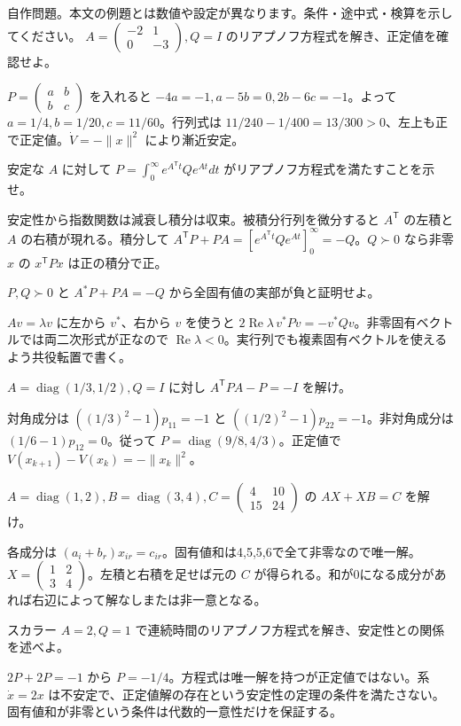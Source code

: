 \documentclass[11pt]{article}
\begin{document}
自作問題。本文の例題とは数値や設定が異なります。条件・途中式・検算を示してください。
\problem[連続時間の成分計算]
$A=\begin{pmatrix}-2&1\\0&-3\end{pmatrix},Q=I$ のリアプノフ方程式を解き、正定値を確認せよ。
\begin{ans}
$P=\begin{pmatrix}a&b\\b&c\end{pmatrix}$ を入れると $-4a=-1,a-5b=0,2b-6c=-1$。よって $a=1/4,b=1/20,c=11/60$。行列式は $11/240-1/400=13/300>0$、左上も正で正定値。$\dot V=-\|x\|^2$ により漸近安定。
\end{ans}
\problem[積分表示]
安定な $A$ に対して $P=\int_0^\infty e^{A^{\mathsf T}t}Qe^{At}dt$ がリアプノフ方程式を満たすことを示せ。
\begin{ans}
安定性から指数関数は減衰し積分は収束。被積分行列を微分すると $A^{\mathsf T}$ の左積と $A$ の右積が現れる。積分して $A^{\mathsf T}P+PA=[e^{A^{\mathsf T}t}Qe^{At}]_0^\infty=-Q$。$Q\succ0$ なら非零 $x$ の $x^{\mathsf T}Px$ は正の積分で正。
\end{ans}
\newpage
\problem[逆向きの安定性]
$P,Q\succ0$ と $A^*P+PA=-Q$ から全固有値の実部が負と証明せよ。
\begin{ans}
$Av=\lambda v$ に左から $v^*$、右から $v$ を使うと $2\operatorname{Re}\lambda\,v^*Pv=-v^*Qv$。非零固有ベクトルでは両二次形式が正なので $\operatorname{Re}\lambda<0$。実行列でも複素固有ベクトルを使えるよう共役転置で書く。
\end{ans}
\problem[離散時間]
$A=\operatorname{diag}(1/3,1/2),Q=I$ に対し $A^{\mathsf T}PA-P=-I$ を解け。
\begin{ans}
対角成分は $((1/3)^2-1)p_{11}=-1$ と $((1/2)^2-1)p_{22}=-1$。非対角成分は $(1/6-1)p_{12}=0$。従って $P=\operatorname{diag}(9/8,4/3)$。正定値で $V(x_{k+1})-V(x_k)=-\|x_k\|^2$。
\end{ans}
\newpage
\problem[Sylvester方程式]
$A=\operatorname{diag}(1,2),B=\operatorname{diag}(3,4),C=\begin{pmatrix}4&10\\15&24\end{pmatrix}$ の $AX+XB=C$ を解け。
\begin{ans}
各成分は $(a_i+b_r)x_{ir}=c_{ir}$。固有値和は4,5,5,6で全て非零なので唯一解。$X=\begin{pmatrix}1&2\\3&4\end{pmatrix}$。左積と右積を足せば元の $C$ が得られる。和が0になる成分があれば右辺によって解なしまたは非一意となる。
\end{ans}
\problem[解はあっても正定値でない]
スカラー $A=2,Q=1$ で連続時間のリアプノフ方程式を解き、安定性との関係を述べよ。
\begin{ans}
$2P+2P=-1$ から $P=-1/4$。方程式は唯一解を持つが正定値ではない。系 $\dot x=2x$ は不安定で、正定値解の存在という安定性の定理の条件を満たさない。固有値和が非零という条件は代数的一意性だけを保証する。
\end{ans}
\end{document}
